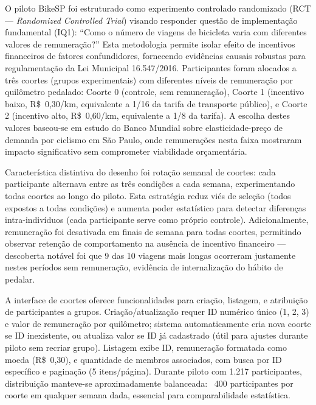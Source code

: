

O piloto BikeSP foi estruturado como experimento controlado randomizado (RCT --- \textit{Randomized Controlled Trial}) visando responder questão de implementação fundamental (IQ1): ``Como o número de viagens de bicicleta varia com diferentes valores de remuneração?'' Esta metodologia permite isolar efeito de incentivos financeiros de fatores confundidores, fornecendo evidências causais robustas para regulamentação da Lei Municipal 16.547/2016. Participantes foram alocados a três coortes (grupos experimentais) com diferentes níveis de remuneração por quilômetro pedalado: Coorte 0 (controle, sem remuneração), Coorte 1 (incentivo baixo, R\$~0,30/km, equivalente a 1/16 da tarifa de transporte público), e Coorte 2 (incentivo alto, R\$~0,60/km, equivalente a 1/8 da tarifa). A escolha destes valores baseou-se em estudo do Banco Mundial sobre elasticidade-preço de demanda por ciclismo em São Paulo, onde remunerações nesta faixa mostraram impacto significativo sem comprometer viabilidade orçamentária.

Característica distintiva do desenho foi rotação semanal de coortes: cada participante alternava entre as três condições a cada semana, experimentando todas coortes ao longo do piloto. Esta estratégia reduz viés de seleção (todos expostos a todas condições) e aumenta poder estatístico para detectar diferenças intra-indivíduos (cada participante serve como próprio controle). Adicionalmente, remuneração foi desativada em finais de semana para todas coortes, permitindo observar retenção de comportamento na ausência de incentivo financeiro --- descoberta notável foi que 9 das 10 viagens mais longas ocorreram justamente nestes períodos sem remuneração, evidência de internalização do hábito de pedalar.

A interface de coortes oferece funcionalidades para criação, listagem, e atribuição de participantes a grupos. Criação/atualização requer ID numérico único (1, 2, 3) e valor de remuneração por quilômetro; sistema automaticamente cria nova coorte se ID inexistente, ou atualiza valor se ID já cadastrado (útil para ajustes durante piloto sem recriar grupo). Listagem exibe ID, remuneração formatada como moeda (R\$~0,30), e quantidade de membros associados, com busca por ID específico e paginação (5 itens/página). Durante piloto com 1.217 participantes, distribuição manteve-se aproximadamente balanceada: ~400 participantes por coorte em qualquer semana dada, essencial para comparabilidade estatística.


